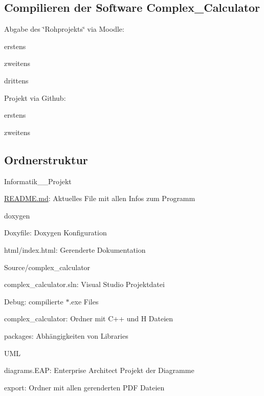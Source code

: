 \subsection*{Compilieren der Software Complex\+\_\+\+Calculator}

Abgabe des \char`\"{}\+Rohprojekts\char`\"{} via Moodle\+:
\begin{DoxyItemize}
\item erstens
\item zweitens
\item drittens
\end{DoxyItemize}

Projekt via Github\+:
\begin{DoxyItemize}
\item erstens
\item zweitens
\end{DoxyItemize}

\subsection*{Ordnerstruktur}

Informatik\+\_\+\_\+\+Projekt
\begin{DoxyItemize}
\item \mbox{\hyperlink{_r_e_a_d_m_e_8md}{R\+E\+A\+D\+M\+E.\+md}}\+: Aktuelles File mit allen Infos zum Programm
\item doxygen
\begin{DoxyItemize}
\item Doxyfile\+: Doxygen Konfiguration
\item html/index.\+html\+: Gerenderte Dokumentation
\end{DoxyItemize}
\item Source/complex\+\_\+calculator
\begin{DoxyItemize}
\item complex\+\_\+calculator.\+sln\+: Visual Studio Projektdatei
\item Debug\+: compilierte $\ast$.exe Files
\item complex\+\_\+calculator\+: Ordner mit C++ und H Dateien
\item packages\+: Abhängigkeiten von Libraries
\end{DoxyItemize}
\item U\+ML
\begin{DoxyItemize}
\item diagrams.\+E\+AP\+: Enterprise Architect Projekt der Diagramme
\item export\+: Ordner mit allen gerenderten P\+DF Dateien
\end{DoxyItemize}
\end{DoxyItemize}

